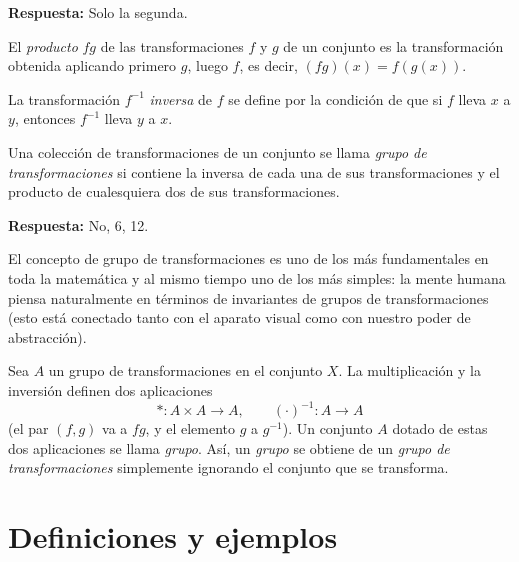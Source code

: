 
\noindent\textbf{Respuesta:} Solo la segunda.
\vspace{0.4cm}


El \textit{producto} $fg$ de las transformaciones $f$ y $g$ de un conjunto es la transformación obtenida aplicando primero $g$, luego $f$, es decir, $(fg)(x)=f(g(x))$.


La transformación $f^{-1}$ \textit{inversa} de $f$ se define por la condición de que si $f$ lleva $x$ a $y$, entonces $f^{-1}$ lleva $y$ a $x$.

Una colección de transformaciones de un conjunto se llama \textit{grupo de transformaciones} si contiene la inversa de cada una de sus transformaciones y el producto de cualesquiera dos de sus transformaciones.


\noindent\textbf{Respuesta:} No, 6, 12.

\vspace{0.4cm}

El concepto de grupo de transformaciones es uno de los más fundamentales en toda la matemática y al mismo tiempo uno de los más simples: la mente humana piensa naturalmente en términos de invariantes de grupos de transformaciones (esto está conectado tanto con el aparato visual como con nuestro poder de abstracción).

Sea $A$ un grupo de transformaciones en el conjunto $X$. La multiplicación y la inversión definen dos aplicaciones
\[
* : A \times A \to A, \qquad (\cdot)^{-1} : A\to A
\]
(el par $(f,g)$ va a $fg$, y el elemento $g$ a $g^{-1}$). Un conjunto $A$ dotado de estas dos aplicaciones se llama \textit{grupo}. Así, un \textit{grupo} se obtiene de un \textit{grupo de transformaciones} simplemente ignorando el conjunto que se transforma.

\clearpage
\section{Definiciones y ejemplos}

